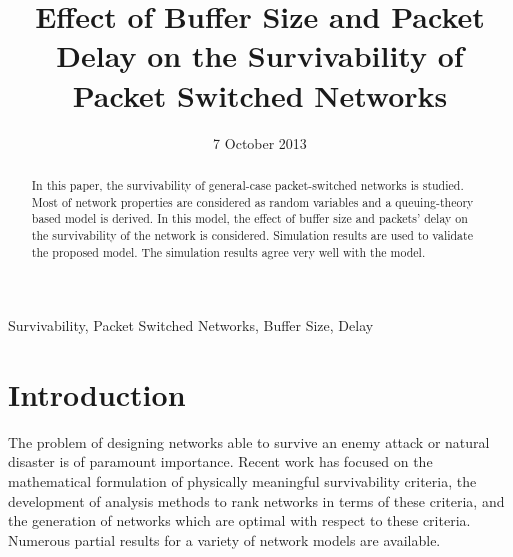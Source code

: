 \documentclass[onecolumn,conference]{IEEEtran}
\begin{document}
    \title{Effect of Buffer Size and Packet Delay on the Survivability of Packet Switched Networks}
    \date{7 October 2013}
    \author{
    \and
    }

    \maketitle

    \begin{abstract}
        In this paper, the survivability of general-case packet-switched networks is studied. Most of network properties are considered as random variables and a queuing-theory based model is derived. In this model, the effect of buffer size and packets' delay on the survivability of the network is considered. Simulation results are used to validate the proposed model. The simulation results agree very well with the model.
    \end{abstract}

    \begin{IEEEkeywords}
        Survivability, Packet Switched Networks, Buffer Size, Delay
    \end{IEEEkeywords}

    \section{Introduction} \label{sec:intro}
    The problem of designing networks able to survive an enemy attack or natural disaster is of paramount importance. Recent work has focused on the mathematical formulation of physically meaningful survivability criteria, the development of analysis methods to rank networks in terms of these criteria, and the generation of networks which are optimal with respect to these criteria. Numerous partial results for a variety of network models are available.
\end{document}
